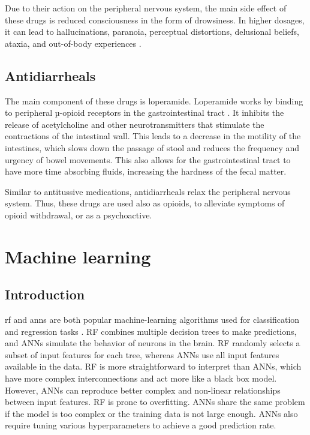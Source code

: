 Due to their action on the peripheral nervous system, the main side effect of these drugs is reduced consciousness in the form of drowsiness. In higher dosages, it can lead to hallucinations, paranoia,
perceptual distortions, delusional beliefs, ataxia, and out-of-body experiences \cite{otcAbuse2020}.

\subsection{Antidiarrheals}

The main component of these drugs is loperamide. Loperamide works by binding to peripheral µ-opioid receptors in the gastrointestinal tract \cite{Malinky2021}. It inhibits the release of acetylcholine and other neurotransmitters that stimulate the contractions of the intestinal wall. This leads to a decrease in the motility of the intestines, which slows down the passage of stool and reduces the frequency and urgency of bowel movements. This also allows for the gastrointestinal tract to have more time absorbing fluids, increasing the hardness of the fecal matter.

Similar to antitussive medications, antidiarrheals relax the peripheral nervous system. Thus, these drugs are used also as opioids, to alleviate symptoms of opioid withdrawal, or as a psychoactive. \cite{otcAbuse2020}

\section{Machine learning}

\subsection{Introduction}

\gls{rf} and \gls{anns} are both popular machine-learning algorithms used for classification and regression tasks \cite{AlZaiti2022}. RF combines multiple decision trees to make predictions, and ANNs simulate the behavior of neurons in the brain. RF randomly selects a subset of input features for each tree, whereas ANNs use all input features available in the data. RF is more straightforward to interpret than ANNs, which have more complex interconnections and act more like a black box model. However, ANNs can reproduce better complex and non-linear relationships between input features. RF is prone to overfitting. ANNs share the same problem if the model is too complex or the training data is not large enough. ANNs also require tuning various hyperparameters to achieve a good prediction rate.

